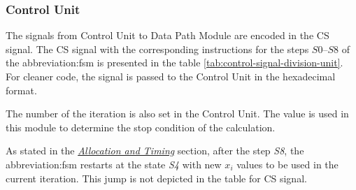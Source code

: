 \documentclass[a4paper, twoside, 11pt]{article}
\newcommand{\fbar}{\FloatBarrier}
\begin{document}
\fbar
\subsubsection{Control Unit}\label{subsubsec:division-control-unit}
The signals from Control Unit to Data Path Module are encoded in the CS signal. The CS signal with the corresponding instructions for the steps $S0$–$S8$ of the \gls{abbreviation:fsm} is presented in the table \ref{tab:control-signal-division-unit}. For cleaner code, the signal is passed to the Control Unit in the hexadecimal format.\par
The number of the iteration is also set in the Control Unit. The value is used in this module to determine the stop condition of the calculation.\par
As stated in the \hyperref[subsubsec:division-allocation-and-timing]{\textit{Allocation and Timing}} section, after the step \textit{S8}, the \gls{abbreviation:fsm} restarts at the state \textit{S4} with new $x_i$ values to be used in the current iteration. This jump is not depicted in the table for CS signal.
\end{document}
